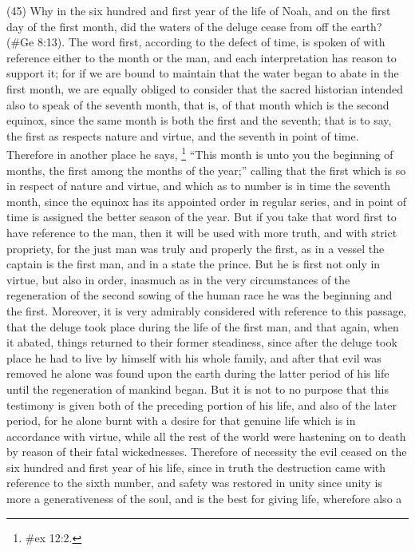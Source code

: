(45) Why in the six hundred and first year of the life of Noah, and on the first day of the first month,
did the waters of the deluge cease from off the earth? (\#Ge 8:13). The word first, according to
the defect of time, is spoken of with reference either to the month or the man, and each
interpretation has reason to support it; for if we are bound to maintain that the water began to
abate in the first month, we are equally obliged to consider that the sacred historian intended also
to speak of the seventh month, that is, of that month which is the second equinox, since the same
month is both the first and the seventh; that is to say, the first as respects nature and virtue, and
the seventh in point of time. Therefore in another place he says, \footnote{\#ex 12:2.} ``This month is unto
you the beginning of months, the first among the months of the year;'' calling that the first which is
so in respect of nature and virtue, and which as to number is in time the seventh month, since the
equinox has its appointed order in regular series, and in point of time is assigned the better season
of the year. But if you take that word first to have reference to the man, then it will be used with
more truth, and with strict propriety, for the just man was truly and properly the first, as in a vessel
the captain is the first man, and in a state the prince. But he is first not only in virtue, but also in
order, inasmuch as in the very circumstances of the regeneration of the second sowing of the
human race he was the beginning and the first. Moreover, it is very admirably considered with
reference to this passage, that the deluge took place during the life of the first man, and that again,
when it abated, things returned to their former steadiness, since after the deluge took place he had
to live by himself with his whole family, and after that evil was removed he alone was found upon
the earth during the latter period of his life until the regeneration of mankind began. But it is not to
no purpose that this testimony is given both of the preceding portion of his life, and also of the later
period, for he alone burnt with a desire for that genuine life which is in accordance with virtue, while
all the rest of the world were hastening on to death by reason of their fatal wickednesses.
Therefore of necessity the evil ceased on the six hundred and first year of his life, since in truth
the destruction came with reference to the sixth number, and safety was restored in unity since
unity is more a generativeness of the soul, and is the best for giving life, wherefore also a
